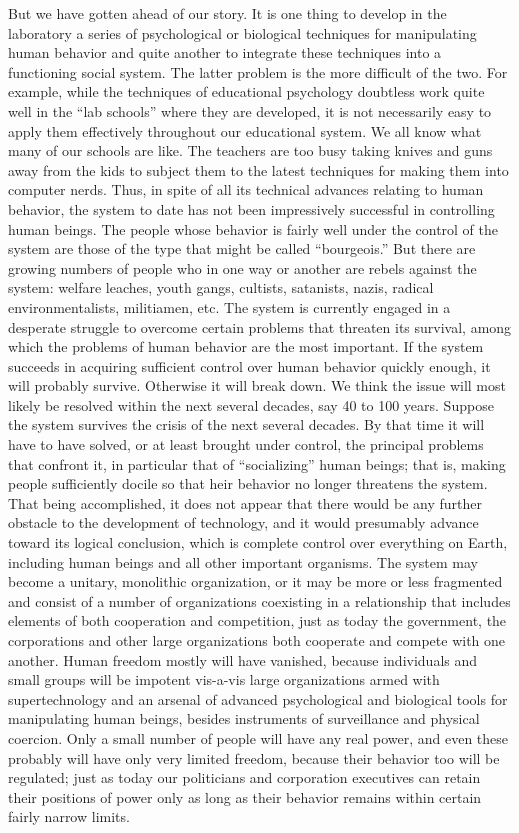  But we have gotten ahead of our story. It is one thing to develop in the laboratory a series of psychological or biological techniques for manipulating human behavior and quite another to integrate these techniques into a functioning social system. The latter problem is the more difficult of the two. For example, while the techniques of educational psychology doubtless work quite well in the “lab schools” where they are developed, it is not necessarily easy to apply them effectively throughout our educational system. We all know what many of our schools are like. The teachers are too busy taking knives and guns away from the kids to subject them to the latest techniques for making them into computer nerds. Thus, in spite of all its technical advances relating to human behavior, the system to date has not been impressively successful in controlling human beings. The people whose behavior is fairly well under the control of the system are those of the type that might be called “bourgeois.” But there are growing numbers of people who in one way or another are rebels against the system: welfare leaches, youth gangs, cultists, satanists, nazis, radical environmentalists, militiamen, etc.
 The system is currently engaged in a desperate struggle to overcome certain problems that threaten its survival, among which the problems of human behavior are the most important. If the system succeeds in acquiring sufficient control over human behavior quickly enough, it will probably survive. Otherwise it will break down. We think the issue will most likely be resolved within the next several decades, say 40 to 100 years.
 Suppose the system survives the crisis of the next several decades. By that time it will have to have solved, or at least brought under control, the principal problems that confront it, in particular that of “socializing” human beings; that is, making people sufficiently docile so that heir behavior no longer threatens the system. That being accomplished, it does not appear that there would be any further obstacle to the development of technology, and it would presumably advance toward its logical conclusion, which is complete control over everything on Earth, including human beings and all other important organisms. The system may become a unitary, monolithic organization, or it may be more or less fragmented and consist of a number of organizations coexisting in a relationship that includes elements of both cooperation and competition, just as today the government, the corporations and other large organizations both cooperate and compete with one another. Human freedom mostly will have vanished, because individuals and small groups will be impotent vis-a-vis large organizations armed with supertechnology and an arsenal of advanced psychological and biological tools for manipulating human beings, besides instruments of surveillance and physical coercion. Only a small number of people will have any real power, and even these probably will have only very limited freedom, because their behavior too will be regulated; just as today our politicians and corporation executives can retain their positions of power only as long as their behavior remains within certain fairly narrow limits.
